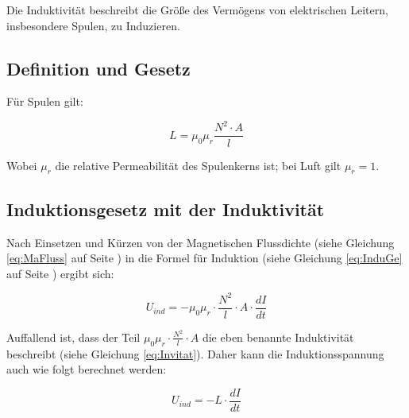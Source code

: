 Die Induktivität beschreibt die Größe des Vermögens von elektrischen Leitern, insbesondere Spulen, zu Induzieren.

\subsection{Definition und Gesetz}

Für Spulen gilt:

\begin{equation} \label{eq:Invitat}
	L = \mu_0 \mu_r \frac{N^2 \cdot A}{l}
\end{equation}

Wobei $\mu_r$ die relative Permeabilität des Spulenkerns ist; bei Luft gilt $ \mu_r = 1$. 


\subsection{Induktionsgesetz mit der Induktivität}

Nach Einsetzen und Kürzen von der Magnetischen Flussdichte (siehe Gleichung \ref{eq:MaFluss} auf Seite \pageref{eq:MaFluss}) in die Formel für Induktion (siehe Gleichung \ref{eq:InduGe} auf Seite \pageref{eq:InduGe}) ergibt sich:

\begin{equation}
	U_{ind} = - \mu_0 \mu_r \cdot \frac{N^2}{l}
				\cdot A \cdot \frac{dI}{dt}
\end{equation}

Auffallend ist, dass der Teil $\mu_0 \mu_r \cdot \frac{N^2}{l} \cdot A$ die eben benannte Induktivität beschreibt (siehe Gleichung \ref{eq:Invitat}). Daher kann die Induktionsspannung auch wie folgt berechnet werden:

\begin{equation}
	U_{ind} = - L \cdot \frac{dI}{dt}
\end{equation}